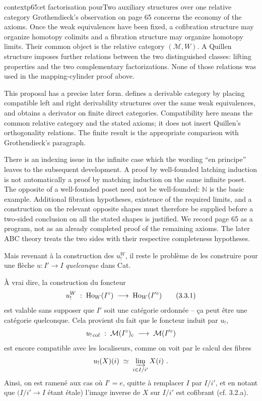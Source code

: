 \begin{dcomment}{context}{p65:et factorisation pour}{Two auxiliary structures over one relative category}
Grothendieck's observation on page 65 concerns the economy of the axioms. Once the weak equivalences have been fixed, a cofibration structure may organize homotopy colimits and a fibration structure may organize homotopy limits. Their common object is the relative category $(\mathcal M,W)$. A Quillen structure imposes further relations between the two distinguished classes: lifting properties and the two complementary factorizations. None of those relations was used in the mapping-cylinder proof above.

This proposal has a precise later form. \citet[Definition 2.25 and Corollary 2.28]{Cisinski2010} defines a derivable category by placing compatible left and right derivability structures over the same weak equivalences, and obtains a derivator on finite direct categories. Compatibility here means the common relative category and the stated axioms; it does not insert Quillen's orthogonality relations. The finite result is the appropriate comparison with Grothendieck's paragraph.

There is an indexing issue in the infinite case which the wording ``en principe'' leaves to the subsequent development. A proof by well-founded latching induction is not automatically a proof by matching induction on the same infinite poset. The opposite of a well-founded poset need not be well-founded: $\mathbb N$ is the basic example. Additional fibration hypotheses, existence of the required limits, and a construction on the relevant opposite shapes must therefore be supplied before a two-sided conclusion on all the stated shapes is justified. We record page 65 as a program, not as an already completed proof of the remaining axioms. The later ABC theory treats the two sides with their respective completeness hypotheses.
\end{dcomment}


Mais revenant à la construction des $u_!^W$, il reste le problème de les construire pour une flèche $u : I'\longrightarrow I$ \textit{quelconque} dans Cat. %

À vrai dire, la construction du foncteur
\[
u_!^W \;:\; \operatorname{Ho}_W(I^\circ) \;\longrightarrow\; \operatorname{Ho}_W(I'^\circ) \tag*{(3.3.1)}
\]
est valable sans supposer que $I'$ soit une catégorie ordonnée – ça peut être une catégorie quelconque. Cela provient du fait que le foncteur induit par $u_!$,
\[
u_{!\,\mathrm{cof}} \;:\; \mathcal{M}(I^\circ)_{\mathrm{c}} \;\longrightarrow\; \mathcal{M}(I'^\circ)
\]
est encore compatible avec les localiseurs, comme on voit par le calcul des fibres
\[
u_!(X)(i) \;\simeq\; \varinjlim_{i\in I/i'} X(i)\ . %
\]
Ainsi, on est ramené aux cas où $I' = e$, quitte à remplacer $I$ par $I/i'$, et en notant que %
$(I/i'\longrightarrow I$ étant étale) l'image inverse de $X$ sur $I/i'$ est cofibrant (cf. 3.2.a). %

